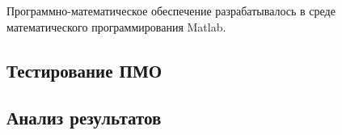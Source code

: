 Программно-математическое обеспечение разрабатывалось в среде математического программирования Matlab.







\subsection{Тестирование ПМО}


\subsection{Анализ результатов}
